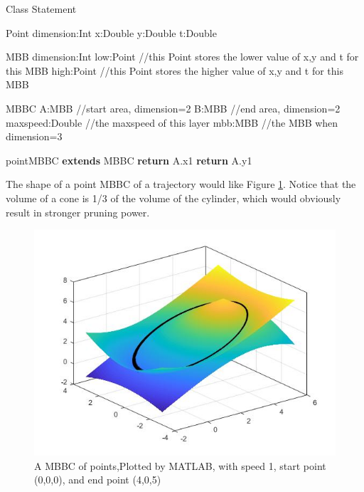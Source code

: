 \documentclass[sigplan]{acmart}
\begin{document}
\begin{algorithm}[ht]
\caption{Class Statement} \label{alg:class}



\begin{algorithmic}[0]
\Ensure Point
    \State dimension:Int
    \State x:Double
    \State y:Double
    \State t:Double

\Ensure MBB
    \State dimension:Int
    \State low:Point //this Point stores the lower value of x,y and t for this MBB
    \State high:Point //this Point stores the higher value of x,y and t for this MBB

\Ensure MBBC
    \State A:MBB //start area, dimension=2
    \State B:MBB //end area, dimension=2
    \State maxspeed:Double //the maxspeed of this layer
    \State mbb:MBB //the MBB when dimension=3

\Ensure pointMBBC \textbf{extends} MBBC
    \State \textbf{return} A.x1
    \EndFunction
    \State \textbf{return} A.y1
    \EndFunction
\end{algorithmic}
\end{algorithm}

The shape of a point MBBC of a trajectory would like Figure \ref{fig:matlab}. Notice that the volume of a cone is 1/3 of the volume of the cylinder, which would obviously result in stronger pruning power. \\
\begin{figure}[ht]
  \centering
  \includegraphics[width=\linewidth]{matlab.jpg}
  \caption{A MBBC of points,Plotted by MATLAB, with speed 1, start point (0,0,0), and end point (4,0,5)}
  \label{fig:matlab}
\end{figure}
\end{document}
